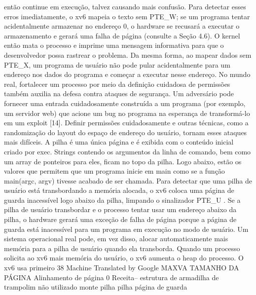 então  continue  em  execução,  talvez  causando  mais  confusão.  Para  detectar  esses  erros  imediatamente,  o  xv6  mapeia  o  texto  
sem  PTE_W;  se  um  programa  tentar  acidentalmente  armazenar  no  endereço  0,  o  hardware  se  recusará  a  executar  o  
armazenamento  e  gerará  uma  falha  de  página  (consulte  a  Seção  4.6).
 O  kernel  então  mata  o  processo  e  imprime  uma  mensagem  informativa  para  que  o  desenvolvedor  possa  rastrear  o  problema.
 Da  mesma  forma,  ao  mapear  dados  sem  PTE_X,  um  programa  de  usuário  não  pode  pular  acidentalmente  para  um
 endereço  nos  dados  do  programa  e  começar  a  executar  nesse  endereço.
 No  mundo  real,  fortalecer  um  processo  por  meio  da  definição  cuidadosa  de  permissões  também  auxilia  na  defesa  contra  
ataques  de  segurança.  Um  adversário  pode  fornecer  uma  entrada  cuidadosamente  construída  a  um  programa  (por  exemplo,  um  
servidor  web)  que  acione  um  bug  no  programa  na  esperança  de  transformá-lo  em  um  exploit  [14].
 Definir  permissões  cuidadosamente  e  outras  técnicas,  como  a  randomização  do  layout  do  espaço  de  endereço  do  usuário,  tornam  
esses  ataques  mais  difíceis.
 A  pilha  é  uma  única  página  e  é  exibida  com  o  conteúdo  inicial  criado  por  exec.  Strings  contendo  os  argumentos  da  linha  de  
comando,  bem  como  um  array  de  ponteiros  para  eles,  ficam  no  topo  da  pilha.  Logo  abaixo,  estão  os  valores  que  permitem  que  
um  programa  inicie  em  main  como  se  a  função  main(argc,  argv)  tivesse  acabado  de  ser  chamada.
 Para  detectar  que  uma  pilha  de  usuário  está  transbordando  a  memória  alocada,  o  xv6  coloca  uma  página  de  guarda  
inacessível  logo  abaixo  da  pilha,  limpando  o  sinalizador  PTE_U .  Se  a  pilha  de  usuário  transbordar  e  o  processo  tentar  usar  um  
endereço  abaixo  da  pilha,  o  hardware  gerará  uma  exceção  de  falha  de  página  porque  a  página  de  guarda  está  inacessível  para  
um  programa  em  execução  no  modo  de  usuário.  Um  sistema  operacional  real  pode,  em  vez  disso,  alocar  automaticamente  mais  
memória  para  a  pilha  de  usuário  quando  ela  transborda.
 Quando  um  processo  solicita  ao  xv6  mais  memória  do  usuário,  o  xv6  aumenta  o  heap  do  processo.  O  xv6  usa  primeiro
 38
Machine Translated by Google
 MAXVA
 TAMANHO  DA  PÁGINA
 Alinhamento  de  página
 0
 Receita--
estrutura  de  
armadilha  de  trampolim
 não  utilizado
 monte
 pilha
 pilha  
página  de  guarda
